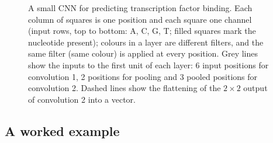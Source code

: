 \begin{figure}[t]
  \caption{A small CNN for predicting transcription factor binding. Each column of squares is one position and each square one channel (input rows, top to bottom: A, C, G, T; filled squares mark the nucleotide present); colours in a layer are different filters, and the same filter (same colour) is applied at every position. Grey lines show the inputs to the first unit of each layer: 6 input positions for convolution 1, 2 positions for pooling and 3 pooled positions for convolution 2. Dashed lines show the flattening of the $2\times2$ output of convolution 2 into a vector.}
  \label{fig:cnn}
\end{figure}

\subsection{A worked example}

